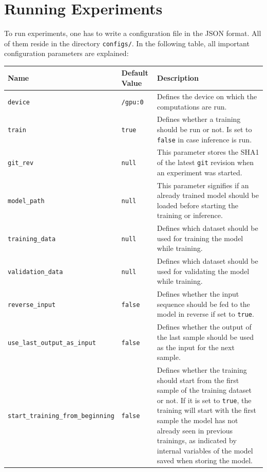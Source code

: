 \clearpage

\section{Running Experiments}
\label{software_usage:running_experiments}
To run experiments, one has to write a configuration file in the JSON format. All of them reside in the directory \texttt{configs/}. In the following table, all important configuration parameters are explained:

\begin{table}[H]
	\centering
	\begin{adjustbox}{max width=\textwidth, max height=\textheight}
		\begin{tabular}{llp{10cm}}
			\toprule
			Name & Default Value & Description\\ \midrule
			\texttt{device} & \texttt{/gpu:0} & Defines the device on which the computations are run.\\
			\texttt{train} & \texttt{true} & Defines whether a training should be run or not. Is set to \texttt{false} in case inference is run.\\
			\texttt{git\_rev} & \texttt{null} & This parameter stores the SHA1 of the latest \texttt{git} revision when an experiment was started.\\
			\texttt{model\_path} & \texttt{null} & This parameter signifies if an already trained model should be loaded before starting the training or inference.\\
			\texttt{training\_data} & \texttt{null} & Defines which dataset should be used for training the model while training.\\
			\texttt{validation\_data} & \texttt{null} & Defines which dataset should be used for validating the model while training.\\
			\texttt{reverse\_input} & \texttt{false} & Defines whether the input sequence should be fed to the model in reverse if set to \texttt{true}.\\
			\texttt{use\_last\_output\_as\_input} & \texttt{false} & Defines whether the output of the last sample should be used as the input for the next sample.\\
			\texttt{start\_training\_from\_beginning} & \texttt{false} & Defines whether the training should start from the first sample of the training dataset or not. If it is set to \texttt{true}, the training will start with the first sample the model has not already seen in previous trainings, as indicated by internal variables of the model saved when storing the model.\\

\end{tabular}
\end{adjustbox}
\end{table}

